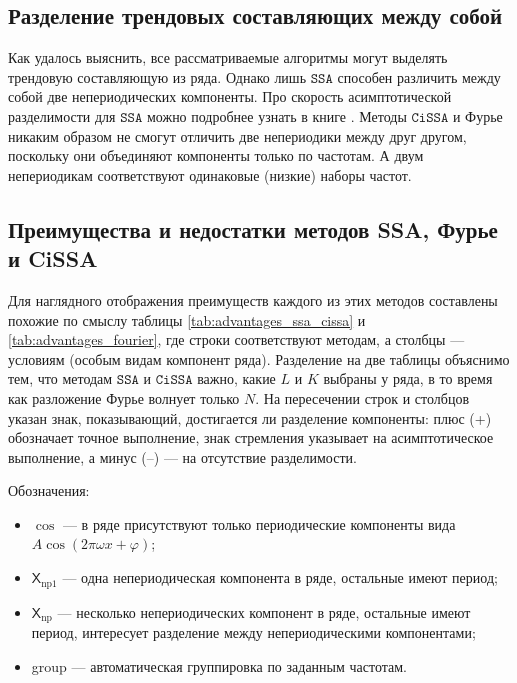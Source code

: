\documentclass[12pt, specialist, subf
]{disser}
\theoremstyle{definition}
\newcommand{\SSA}{\texttt{SSA}}
\newcommand{\CISSA}{\texttt{CiSSA}}
\newcommand{\TS}{\mathsf{X}}
\begin{document}
\subsection{Разделение трендовых составляющих между собой}
\label{subsubsec:nonperiodic}

Как удалось выяснить, все рассматриваемые алгоритмы могут выделять трендовую составляющую из ряда. Однако лишь $\SSA$ способен различить между собой две непериодических компоненты. Про скорость асимптотической разделимости для $\SSA$ можно подробнее узнать в книге \cite{golyandina2001analysis}. Методы $\CISSA$ и Фурье никаким образом не смогут отличить две непериодики между друг другом, поскольку они объединяют компоненты только по частотам. А двум непериодикам соответствуют одинаковые (низкие) наборы частот.


\subsection{Преимущества и недостатки методов SSA, Фурье и CiSSA}

Для наглядного отображения преимуществ каждого из этих методов составлены похожие по смыслу таблицы \ref{tab:advantages_ssa_cissa} и \ref{tab:advantages_fourier}, где строки соответствуют методам, а столбцы --- условиям (особым видам компонент ряда). Разделение на две таблицы объяснимо тем, что методам $\SSA$ и $\CISSA$ важно, какие $L$ и  $K$ выбраны у ряда, в то время как разложение Фурье волнует только $N$. На пересечении строк и столбцов указан знак, показывающий, достигается ли разделение компоненты: плюс (+) обозначает точное выполнение, знак стремления указывает на асимптотическое выполнение, а минус (–) --- на отсутствие разделимости.

Обозначения:
\begin{itemize}
	\item $\cos$ --- в ряде присутствуют только периодические компоненты вида $A\cos(2\pi \omega x + \varphi)$;
	\item $\TS_{\mathrm{np}1}$ --- одна непериодическая компонента в ряде, остальные имеют период;
	\item $\TS_{\mathrm{np}}$ --- несколько непериодических компонент в ряде, остальные имеют период, интересует разделение между
	      непериодическими компонентами;
	\item group --- автоматическая группировка по заданным частотам.
\end{itemize}
\end{document}

